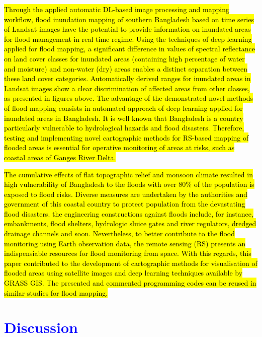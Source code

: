\documentclass[water,article,submit,pdftex,moreauthors]{Definitions/mdpi}
\begin{document}
\hl{Through the applied automatic DL-based image processing and mapping workflow, flood inundation mapping of southern Bangladesh based on time series of Landsat images have the potential to provide information on inundated areas for flood management in real time regime. Using the techniques of deep learning applied for flood mapping, a significant difference in values of spectral reflectance on land cover classes for inundated areas (containing high percentage of water and moisture) and non-water (dry) areas enables a distinct separation between these land cover categories. Automatically derived ranges for inundated areas in Landsat images show a clear discrimination of affected areas from other classes, as presented in figures above. The advantage of the demonstrated novel methods of flood mapping consists in automated approach of deep learning applied for inundated areas in Bangladesh. It is well known that Bangladesh is a country particularly vulnerable to hydrological hazards and flood disasters. Therefore, testing and implementing novel cartographic methods for RS-based mapping of flooded areas is essential for operative monitoring of areas at risks, such as coastal areas of Ganges River Delta.} 

\hl{The cumulative effects of flat topographic relief and monsoon climate resulted in high vulnerability of Bangladesh to the floods with over 80\% of the population is exposed to flood risks. Diverse measures are undertaken by the authorities and government of this coastal country to protect population from the devastating flood disasters. the engineering constructions against floods include, for instance, embankments, flood shelters, hydrologic sluice gates and river regulators, dredged drainage channels and soon. Nevertheless, to better contribute to the flood monitoring using Earth observation data, the remote sensing (RS) presents an indispensiable resources for flood monitoring from space. With this regards, this paper contributed to the development of cartographic methods for visualisation of flooded areas using satellite images and deep learning techniques available by GRASS GIS. The presented and commented programming codes can be reused in similar studies for flood mapping.}
 
\section{\textcolor{blue}{Discussion}}
\end{document}
